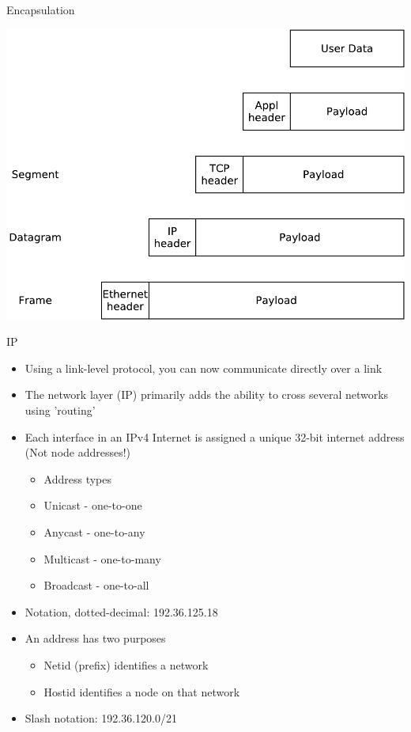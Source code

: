 \documentclass{beamer}
\begin{document}
\begin{frame}{Encapsulation}
  \begin{center}
    \includegraphics[width=0.7\linewidth]{encapsulation}
  \end{center}
\end{frame}

\begin{frame}{IP}
  \begin{itemize}
  \item Using a link-level protocol, you can now communicate
    directly over a link
  \item<2-> The network layer (IP) primarily adds the ability to cross
    several networks using 'routing'
  \item<2-> Each interface in an IPv4 Internet is assigned a unique 32-bit
internet address (Not node addresses!)
  \begin{itemize}
\item Address types
\item Unicast - one-to-one
\item Anycast - one-to-any
\item Multicast - one-to-many
\item Broadcast - one-to-all
  \end{itemize}
\item<3-> Notation, dotted-decimal: 192.36.125.18
\item<3-> An address has two purposes
  \begin{itemize}
\item Netid (prefix) identifies a network
\item Hostid identifies a node on that network
  \end{itemize}
\item<4-> Slash notation: 192.36.120.0/21
  \end{itemize}
\end{frame}
\end{document}

